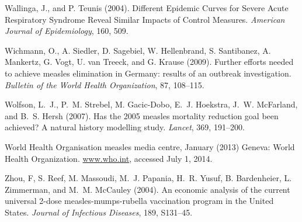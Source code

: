 \documentclass{article}
\begin{document}
\begin{thebibliography}{}
Wallinga, J., and P. Teunis (2004).
\newblock Different Epidemic Curves for Severe Acute Respiratory Syndrome Reveal Similar Impacts of Control Measures.
\newblock \emph{American Journal of Epidemiology}, 160, 509.

Wichmann, O., A. Siedler, D. Sagebiel, W. Hellenbrand, S. Santibanez, A. Mankertz, G. Vogt, U. van Treeck, and G. Krause (2009).
\newblock Further efforts needed to achieve measles elimination in Germany: results of an outbreak investigation.
\newblock \emph{Bulletin of the World Health Organization}, 87, 108--115.

Wolfson, L.~J., P.~M. Strebel, M. Gacic-Dobo, E.~J. Hoekstra, J.~W. McFarland, and B.~S. Hersh (2007).
\newblock Has the 2005 measles mortality reduction goal been achieved? A natural history modelling study.
\newblock \emph{Lancet}, 369, 191--200.

World Health Organisation measles media centre, January (2013)
\newblock Geneva: World Health Organization.
\href{http://www.who.int/mediacentre/news/notes/2013/measles_20130117/en/}{www.who.int}, accessed July 1, 2014.

Zhou, F, S. Reef, M. Massoudi, M.~J. Papania, H.~R. Yusuf, B. Bardenheier, L. Zimmerman, and M.~M. McCauley (2004).
\newblock An economic analysis of the current universal 2-dose measles-mumps-rubella vaccination program in the United States.
\newblock \emph{Journal of Infectious Diseases}, 189, S131--45.

\end{thebibliography}
\end{document}
